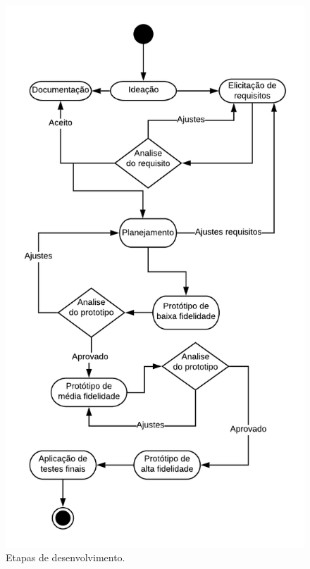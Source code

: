 \documentclass[10pt, conference, compsocconf]{IEEEtran}
\begin{document}
\begin{figure}[!htbp]
	\centerline{\includegraphics[scale=0.7]{Figuras/fig1.png}}
	\caption{Etapas de desenvolvimento.}
	\label{fig1}
\end{figure}
\end{document}
